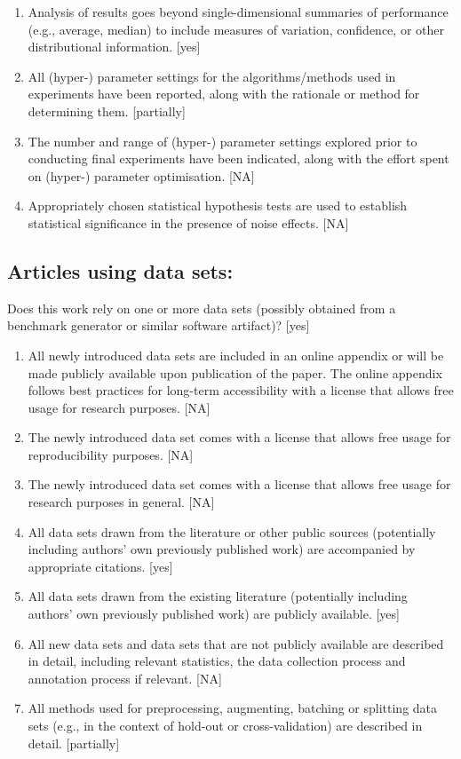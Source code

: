 \documentclass[manuscript,screen,review]{jair}
\begin{document}
\begin{enumerate}
    \item Analysis of results goes beyond single-dimensional summaries of performance (e.g., average, median) to include measures of variation, confidence, or other distributional information. [yes]
    \item All (hyper-) parameter settings for the algorithms/methods used in experiments have been reported, along with the rationale or method for determining them. [partially]
    \item The number and range of (hyper-) parameter settings explored prior to conducting final experiments have been indicated, along with the effort spent on (hyper-) parameter optimisation. [NA]
    \item Appropriately chosen statistical hypothesis tests are used to establish statistical significance in the presence of noise effects. [NA]
\end{enumerate}

\subsection*{Articles using data sets:}
Does this work rely on one or more data sets (possibly obtained from a benchmark generator or similar software artifact)? [yes]
\begin{enumerate}
    \item All newly introduced data sets are included in an online appendix or will be made publicly available upon publication of the paper. The online appendix follows best practices for long-term accessibility with a license that allows free usage for research purposes. [NA]
    \item The newly introduced data set comes with a license that allows free usage for reproducibility purposes. [NA]
    \item The newly introduced data set comes with a license that allows free usage for research purposes in general. [NA]
    \item All data sets drawn from the literature or other public sources (potentially including authors' own previously published work) are accompanied by appropriate citations. [yes]
    \item All data sets drawn from the existing literature (potentially including authors' own previously published work) are publicly available. [yes]
    \item All new data sets and data sets that are not publicly available are described in detail, including relevant statistics, the data collection process and annotation process if relevant. [NA]
    \item All methods used for preprocessing, augmenting, batching or splitting data sets (e.g., in the context of hold-out or cross-validation) are described in detail. [partially]
\end{enumerate}
\end{document}
